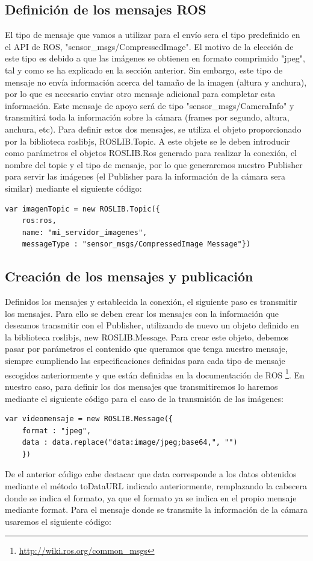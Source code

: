\subsection{Definición de los mensajes ROS}
El tipo de mensaje que vamos a utilizar para el envío sera el tipo predefinido en el API de ROS, "sensor\_msgs/CompressedImage". El motivo de la elección de este tipo es debido a que las imágenes se obtienen en formato comprimido "jpeg", tal y como se ha explicado en la sección anterior. Sin embargo, este tipo de mensaje no envía información acerca del tamaño de la imagen (altura y anchura), por lo que es necesario enviar otro mensaje adicional para completar esta información. Este mensaje de apoyo será de tipo "sensor\_msgs/CameraInfo" y transmitirá toda la información sobre la cámara (frames por segundo, altura, anchura, etc). Para definir estos dos mensajes, se utiliza el objeto proporcionado por la biblioteca roslibjs, ROSLIB.Topic. A este objete se le deben introducir como parámetros el objetos ROSLIB.Ros generado para realizar la conexión, el nombre del topic y el tipo de mensaje, por lo que generaremos nuestro Publisher para servir las imágenes (el Publisher para la información de la cámara sera similar) mediante el siguiente código:
\begin{lstlisting}[frame=single]
var imagenTopic = new ROSLIB.Topic({
	ros:ros, 
	name: "mi_servidor_imagenes", 
	messageType : "sensor_msgs/CompressedImage Message"})

\end{lstlisting}

\subsection{Creación de los mensajes y publicación}
Definidos los mensajes y establecida la conexión, el siguiente paso es transmitir los mensajes. Para ello se deben crear los mensajes con la información que deseamos transmitir con el Publisher, utilizando de nuevo un objeto definido en la biblioteca roslibjs, new ROSLIB.Message. Para crear este objeto, debemos pasar por parámetros el contenido que queramos que tenga nuestro mensaje, siempre cumpliendo las especificaciones definidas para cada tipo de mensaje escogidos anteriormente y que están definidas en la documentación de ROS  \footnote{\url{http://wiki.ros.org/common_msgs}}. En nuestro caso, para definir los dos mensajes que transmitiremos lo haremos mediante el siguiente código para el caso de la transmisión de las imágenes:
\begin{lstlisting}[frame=single]
 var videomensaje = new ROSLIB.Message({
 	format : "jpeg", 
	data : data.replace("data:image/jpeg;base64,", "")
	})

\end{lstlisting}
De el anterior código cabe destacar que data corresponde a los datos obtenidos mediante el método toDataURL indicado anteriormente, remplazando la cabecera donde se indica el formato, ya que el formato ya se indica en el propio mensaje mediante format.  Para el mensaje donde se transmite la información de la cámara usaremos el siguiente código:

